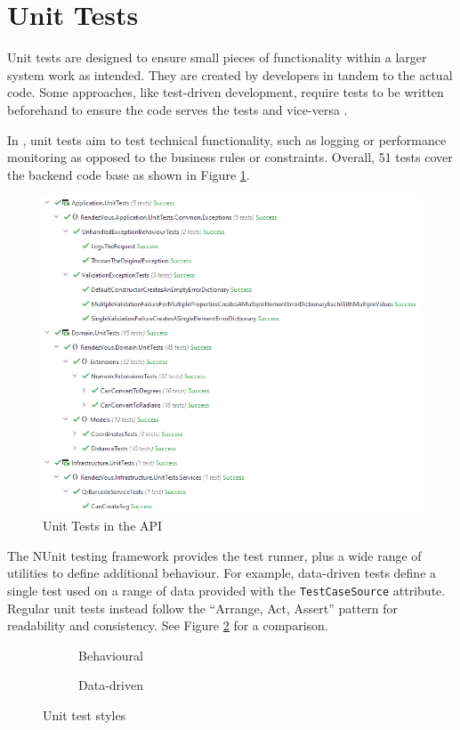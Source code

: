 \section{Unit Tests}

Unit tests are designed to ensure small pieces of
functionality within a larger system work as intended.
They are created by developers in tandem to the actual
code.
Some approaches, like test-driven development, require
tests to be written beforehand to ensure the code serves
the tests and vice-versa \parencite{softwareTesting}.

In \projectname{}, unit tests aim to test technical
functionality, such as logging or performance monitoring as
opposed to the business rules or constraints. Overall, 51
tests cover the backend code base as shown in 
Figure \ref{fig:unitTestRunner}.

\begin{figure}[h]
  \centering
  \includegraphics[width=0.9\linewidth]{07 testing/assets/unit/unit test runner.png}
  \caption{Unit Tests in the API}
  \label{fig:unitTestRunner}
\end{figure}

The NUnit testing framework provides the test runner, plus
a wide range of utilities to define additional behaviour.
For example, data-driven tests define a single test used on
a range of data provided with the
\lstinline{TestCaseSource} attribute.
Regular unit tests instead follow the \enquote{Arrange,
  Act, Assert} pattern for readability and consistency.
See Figure \ref{fig:unitTestStyles} for a comparison.

\begin{figure}[h]
  \centering
  \codesize

  \begin{subfigure}{\linewidth}
    
    \caption{Behavioural}
  \end{subfigure}
  \begin{subfigure}{\linewidth}
    
    \caption{Data-driven}
  \end{subfigure}

  \caption{Unit test styles}
  \label{fig:unitTestStyles}
\end{figure}
